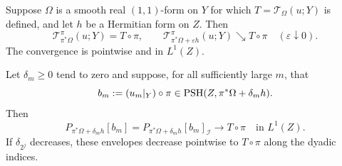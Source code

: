 \begin{theorem}\label{thm:trace-envelope-modification}
Suppose $\Omega$ is a smooth real $(1,1)$-form on $Y$ for which $T=\mathcal T_\Omega(u;Y)$ is defined, and let $h$ be a Hermitian form on $Z$. Then
\begin{equation}\label{eq:trace-envelope-modification}
 \mathcal T^\pi_{\pi^*\Omega}(u;Y)=T\circ\pi,
 \qquad
 \mathcal T^\pi_{\pi^*\Omega+\varepsilon h}(u;Y)
       \searrow T\circ\pi\quad(\varepsilon\downarrow0).
\end{equation}
The convergence is pointwise and in $L^1(Z)$.

Let $\delta_m\geq0$ tend to zero and suppose, for all sufficiently large $m$, that
\[
 b_m:=(u_m|_Y)\circ\pi\in\mathrm{PSH}(Z,\pi^*\Omega+\delta_m h).
\]
Then
\[
 P_{\pi^*\Omega+\delta_m h}[b_m]
 =P_{\pi^*\Omega+\delta_m h}[b_m]_{\mathcal I}
 \longrightarrow T\circ\pi\quad\text{in }L^1(Z).
\]
If $\delta_{2^j}$ decreases, these envelopes decrease pointwise to $T\circ\pi$ along the dyadic indices.
\end{theorem}
